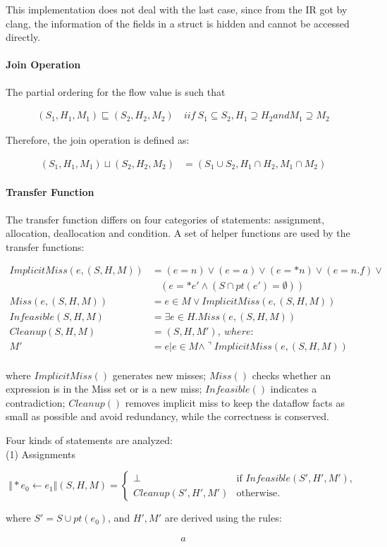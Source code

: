 This implementation does not deal with the last case, since from the 
\llvm IR got by clang, the information of the fields in a struct is hidden and 
cannot be accessed directly.

\paragraph{Join Operation}

The partial ordering for the flow value is such that 

\begin{align*}
  (S_1,H_1,M_1)\sqsubseteq (S_2,H_2,M_2) \ &iif \ 
  S_1\subseteq S_2, H_1\supseteq H_2 and M_1\supseteq M_2
\end{align*}

Therefore, the join operation is defined as:

\begin{align*}
  (S_1,H_1,M_1)\sqcup (S_2,H_2,M_2) &= (S_1\cup S_2,H_1\cap H_2,M_1\cap M_2)
\end{align*}


\paragraph{Transfer Function}

The transfer function differs on four categories of statements: assignment, 
allocation, deallocation and condition. A set of helper functions are used 
by the transfer functions:

\begin{align*}
  ImplicitMiss(e,(S,H,M)) &= (e=n) \vee (e=a) \vee (e=*n) \vee (e=n.f) \vee \\
                          &\ \ \ \ (e=*e' \wedge (S\cap pt(e')=\emptyset)) \\
  Miss(e,(S,H,M)) &= e\in M \vee ImplicitMiss(e,(S,H,M)) \\
Infeasible(S,H,M) &= \exists e \in H. Miss(e,(S,H,M)) \\
   Cleanup(S,H,M) &= (S,H,M'), \ where: \\
  M' &= {e|e\in M \wedge \urcorner ImplicitMiss(e,(S,H,M))} \\
\end{align*}

where $ImplicitMiss()$ generates new misses;
$Miss()$ checks whether an expression is in the Miss set or is a new miss; 
$Infeasible()$ indicates a contradiction;
$Cleanup()$ removes implicit miss to keep the dataflow facts as small as possible and avoid redundancy, while the correctness is conserved.

Four kinds of statements are analyzed: \\
(1) Assignments

\[
\Vert *e_0 \gets e_1 \Vert(S,H,M)=\begin{cases}
\bot& \text{if $Infeasible(S',H',M')$},\\
Cleanup(S',H',M')& \text{otherwise}.
\end{cases}
\]

where $S'=S\cup pt(e_0)$, and $H',M'$ are derived using the rules:

\begin{align*}
a
\end{align*}
